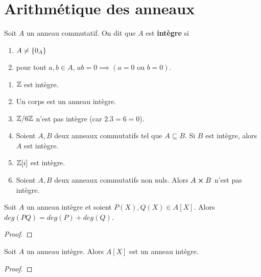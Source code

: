 \section{Arithmétique des anneaux}

\begin{definition} 
	Soit $A$ un anneau commutatif. On dit que $A$ est \textbf{intègre} si
	\begin{enumerate}
		\item $A \neq \left\{ 0_{A} \right\}$
		\item pour tout $a, b \in A$, $ab = 0 \implies (a = 0 \text{ ou } b =
			0)$.
	\end{enumerate}
\end{definition}

\begin{exemple}
	\begin{enumerate}
		\item $\mathbb{Z}$ est intègre.
		\item Un corps est un anneau intègre.
		\item $\mathbb{Z} / 6 \mathbb{Z}$ n'est pas intègre (car $2 . 3 = 6 = 0$).
		\item Soient $A, B$ deux anneaux commutatifs tel que $A \subseteq B$. Si
			$B$ est intègre, alors $A$ est intègre.
		\item $\mathbb{Z}[i]$ est intègre.
		\item Soient $A, B$ deux anneaux commutatifs non nuls. Alors $A
			\cross B$ n'est pas intègre.
	\end{enumerate}
\end{exemple}

\begin{proposition}
	Soit $A$ un anneau intègre et soient $P(X), Q(X) \in A[X]$. Alors $deg(P Q)
	= deg(P) + deg(Q)$.
\end{proposition}

\ifdefined\outputproof
\begin{proof}

\end{proof}
\fi

\begin{proposition}
	Soit $A$ un anneau intègre. Alors $A[X]$ est un anneau intègre.
\end{proposition}

\ifdefined\outputproof
\begin{proof}

\end{proof}
\fi

